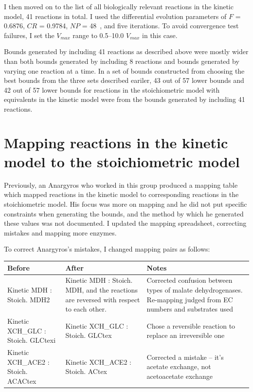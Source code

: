 \documentclass[parskip=full]{scrreprt}
\begin{document}
I then moved on to the list of all biologically relevant reactions in the kinetic model, 41 reactions in total. I used the differential evolution parameters of $F$ = 0.6876, $CR$ = 0.9784, $NP$ = 48~\cite{pedersen_good_2010}, and five iterations. To avoid convergence test failures, I set the $V_{max}$ range to 0.5--10.0 $V_{max}$ in this case.

Bounds generated by including 41 reactions as described above were mostly wider than both bounds generated by including 8 reactions and bounds generated by varying one reaction at a time. In a set of bounds constructed from choosing the best bounds from the three sets described eariler, 43 out of 57 lower bounds and 42 out of 57 lower bounds for reactions in the stoichiometric model with equivalents in the kinetic model were from the bounds generated by including 41 reactions.

\section{Mapping reactions in the kinetic model to the stoichiometric model}
\label{sec:mapping}

Previously, an Anargyros who worked in this group produced a mapping table which mapped reactions in the kinetic model to corresponding reactions in the stoichiometric model. His focus was more on mapping and he did not put specific constraints when generating the bounds, and the method by which he generated these values was not documented. I updated the mapping spreadsheet, correcting mistakes and mapping more enzymes.

To correct Anargyros's mistakes, I changed mapping pairs as follows:

\begin{tabularx}{\linewidth}{|L|L|L|}
  \hline
  Before & After & Notes\\
  \hline
  Kinetic MDH : Stoich. MDH2 & Kinetic MDH : Stoich. MDH, and the reactions are reversed with respect to each other. & Corrected confusion between types of malate dehydrogenases. Re-mapping judged from EC numbers and substrates used\\
  \hline
  Kinetic XCH\_GLC : Stoich. GLCtexi & Kinetic XCH\_GLC : Stoich. GLCtex & Chose a reversible reaction to replace an irreversible one\\
  \hline
  Kinetic XCH\_ACE2 : Stoich. ACACtex & Kinetic XCH\_ACE2 : Stoich. ACtex & Corrected a mistake -- it's acetate exchange, not acetoacetate exchange\\
  \hline
\end{tabularx}
\end{document}
